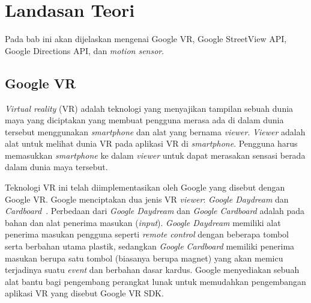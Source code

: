 \chapter{Landasan Teori}
\label{chap:teori}
Pada bab ini akan dijelaskan mengenai Google VR, Google StreetView API, Google Directions API, dan \textit{motion sensor}.

\section{Google VR}
\label{sec:google-vr} 
\textit{Virtual reality} (VR) adalah teknologi yang menyajikan tampilan sebuah dunia maya yang diciptakan yang membuat pengguna merasa ada di dalam dunia tersebut menggunakan \textit{smartphone} dan alat yang bernama \textit{viewer}. \textit{Viewer} adalah alat untuk melihat dunia VR pada aplikasi VR di \textit{smartphone}. Pengguna harus memasukkan \textit{smartphone} ke dalam \textit{viewer} untuk dapat merasakan sensasi berada dalam dunia maya tersebut.

Teknologi VR ini telah diimplementasikan oleh Google yang disebut dengan Google VR. Google menciptakan dua jenis VR \textit{viewer}: \textit{Google Daydream} dan \textit{Cardboard}~\cite{quickstart-google-vr}. Perbedaan dari \textit{Google Daydream} dan \textit{Google Cardboard} adalah pada bahan dan alat penerima masukan (\textit{input}). \textit{Google Daydream} memiliki alat penerima masukan pengguna seperti \textit{remote control} dengan beberapa tombol serta berbahan utama plastik, sedangkan \textit{Google Cardboard} memiliki penerima masukan berupa satu tombol (biasanya berupa magnet) yang akan memicu terjadinya suatu \textit{event} dan berbahan dasar kardus. Google menyediakan sebuah alat bantu bagi pengembang perangkat lunak untuk memudahkan pengembangan aplikasi VR yang disebut Google VR SDK.

